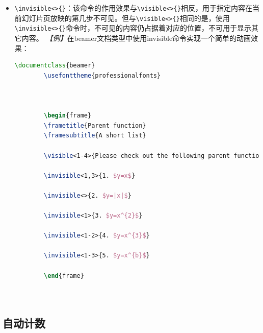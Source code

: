 \begin{itemize}
\begin{lstlisting}[language=TeX]
        \only<1->{Please check out the following parent function list.}

        \only<2,4>{1. $y=x$}

        \only<1-4>{2. $y=|x|$}

        \only<2->{3. $y=x^{2}$}

        \only<3->{4. $y=x^{3}$}

        \only<4>{5. $y=x^{b}$}

        \end{frame}

        
    \end{lstlisting}
    \item \texttt{\textbackslash{}invisible<>\{\}}：该命令的作用效果与\texttt{\textbackslash{}visible<>\{\}}相反，用于指定内容在当前幻灯片页放映的第几步不可见。但与\texttt{\textbackslash{}visible<>\{\}}相同的是，使用\texttt{\textbackslash{}invisible<>\{\}}命令时，不可见的内容仍占据着对应的位置，不可用于显示其它内容。
          \emph{【例】}在beamer文档类型中使用invisible命令实现一个简单的动画效果：
          \begin{lstlisting}[language=TeX]
        \documentclass{beamer}
        \usefonttheme{professionalfonts}

        

        \begin{frame}
        \frametitle{Parent function}
        \framesubtitle{A short list}

        \visible<1-4>{Please check out the following parent function list.}

        \invisible<1,3>{1. $y=x$}

        \invisible<>{2. $y=|x|$}

        \invisible<1>{3. $y=x^{2}$}

        \invisible<1-2>{4. $y=x^{3}$}

        \invisible<1-3>{5. $y=x^{b}$}

        \end{frame}

        
    \end{lstlisting}
\end{itemize}

\subsection{自动计数}

